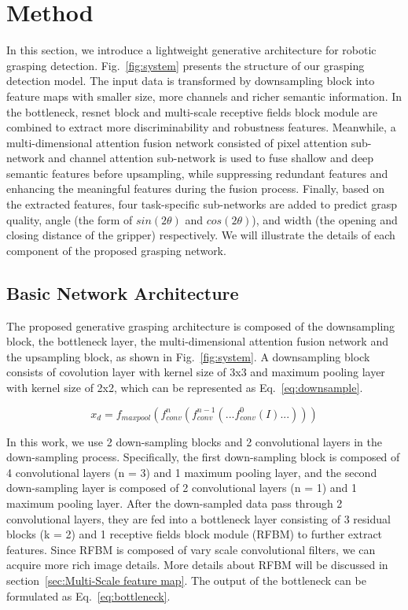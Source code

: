 \documentclass[journal]{IEEEtran}
\begin{document}
\section{Method}
\label{sec:GraspingProposalsDetection}
In this section, we introduce a lightweight generative architecture for robotic grasping detection. Fig.~\ref{fig:system} presents the structure of our grasping detection model. The input data is transformed by downsampling block into feature maps with smaller size, more channels and richer semantic information. In the bottleneck, resnet block and multi-scale receptive fields block module are combined to extract more discriminability and robustness features. Meanwhile, a multi-dimensional attention fusion network consisted of pixel attention sub-network and channel attention sub-network is used to fuse shallow and deep semantic features before upsampling, while suppressing redundant features and enhancing the meaningful features during the fusion process. Finally, based on the extracted features, four task-specific sub-networks are added to predict grasp quality, angle (the form of $sin(2\theta)$ and $cos(2\theta)$), and width (the opening and closing distance of the gripper) respectively. We will illustrate the details of each component of the proposed grasping network.


\subsection{Basic Network Architecture}

The proposed generative grasping architecture is composed of the downsampling block, the bottleneck layer, the multi-dimensional attention fusion network and the upsampling block, as shown in Fig.~\ref{fig:system}. 
A downsampling block consists of covolution layer with kernel size of 3x3 and maximum pooling layer with kernel size of 2x2, which can be represented as Eq.~\ref{eq:downsample}. 

\begin{equation}
x_{d} = f_{maxpool}(f_{conv}^n(f_{conv}^{n-1}(...f_{conv}^0(I)...)))
\label{eq:downsample}
\end{equation}

In this work, we use 2 down-sampling blocks and 2 convolutional layers in the down-sampling process. Specifically, the first down-sampling block is composed of 4 convolutional layers (n = 3) and 1 maximum pooling layer, and the second down-sampling layer is composed of 2 convolutional layers (n = 1) and 1 maximum pooling layer. After the down-sampled data pass through 2 convolutional layers,  they are fed into a bottleneck layer consisting of 3 residual blocks (k = 2) and 1 receptive fields block module (RFBM) to further extract features. Since RFBM is composed of vary scale convolutional filters, we can acquire more rich image details. More details about RFBM will be discussed in section~\ref{sec:Multi-Scale feature map}. The output of the bottleneck can be formulated as Eq.~\ref{eq:bottleneck}.
\end{document}
